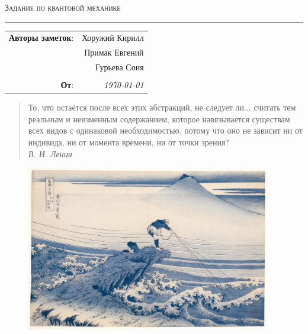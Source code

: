 
\begin{center}
    \LARGE \textsc{Задание по квантовой механике}
\end{center}

\hrule

\phantom{42}

\begin{flushright}
    \begin{tabular}{rr}
        \textbf{Авторы заметок}: 
        & Хоружий Кирилл \\
        & Примак Евгений \\
        & Гурьева Соня \\
        & \\
        \textbf{От}: &
        \textit{\today}\\
    \end{tabular}
\end{flushright}
\thispagestyle{empty}


\phantom{42}

\noindent
\begin{minipage}{0.7\textwidth}
     \begin{quotation}
        То, что остаётся после всех этих абстракций, не следует ли... считать тем реальным и неизменным содержанием, которое навязывается существам всех видов с одинаковой необходимостью, потому что оно не зависит ни от индивида, ни от момента времени, ни от точки зрения? \\
        \phantom{42} \hfill \textit{В. И. Ленин}
    \end{quotation}
\end{minipage}


\vfill


\begin{figure}[h]
    \centering
    \includegraphics[width=0.95\textwidth]{figures/pic1.jpeg}
\end{figure}

